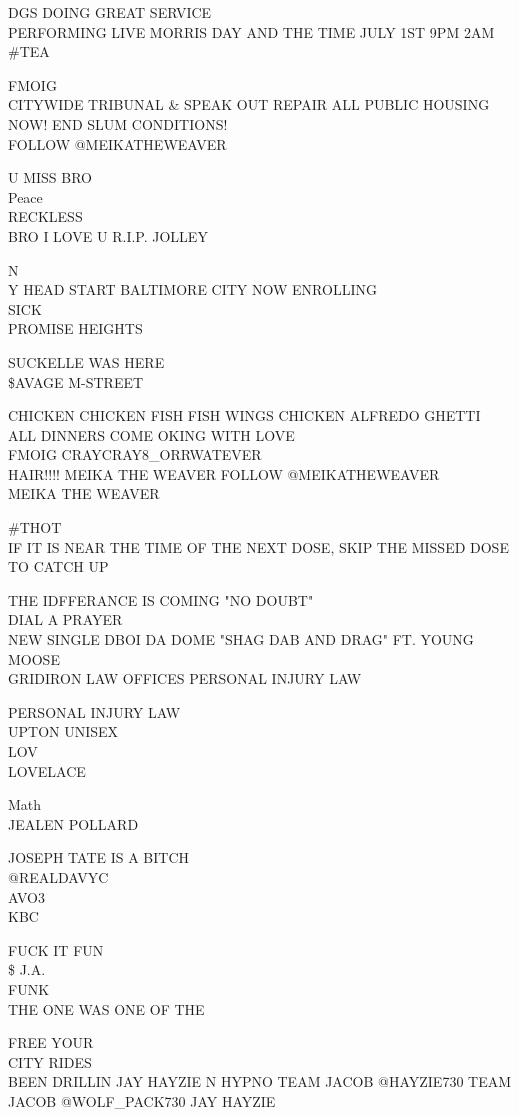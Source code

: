 \documentclass[10pt,letterpaper]{article}
\begin{document}
DGS DOING GREAT SERVICE\\
PERFORMING LIVE MORRIS DAY AND THE TIME JULY 1ST 9PM 2AM\\
\#TEA

FMOIG\\
CITYWIDE TRIBUNAL \& SPEAK OUT REPAIR ALL PUBLIC HOUSING NOW!  END SLUM CONDITIONS!\\
FOLLOW @MEIKATHEWEAVER

U MISS BRO\\
Peace\\
RECKLESS\\
BRO I LOVE U R.I.P. JOLLEY

N\\
Y HEAD START BALTIMORE CITY NOW ENROLLING\\
SICK\\
PROMISE HEIGHTS

SUCKELLE WAS HERE\\
\$AVAGE M{-}STREET

CHICKEN CHICKEN FISH FISH WINGS CHICKEN ALFREDO GHETTI ALL DINNERS COME OKING WITH LOVE\\
FMOIG CRAYCRAY8\_ORRWATEVER\\
HAIR!!!! MEIKA THE WEAVER FOLLOW @MEIKATHEWEAVER\\
MEIKA THE WEAVER

\#THOT\\
IF IT IS NEAR THE TIME OF THE NEXT DOSE, SKIP THE MISSED DOSE TO CATCH UP

THE IDFFERANCE IS COMING "NO DOUBT"\\
DIAL A PRAYER\\
NEW SINGLE DBOI DA DOME "SHAG DAB AND DRAG" FT. YOUNG MOOSE\\
GRIDIRON LAW OFFICES PERSONAL INJURY LAW

PERSONAL INJURY LAW\\
UPTON UNISEX\\
LOV\\
LOVELACE

Math\\
JEALEN POLLARD

JOSEPH TATE IS A BITCH\\
@REALDAVYC\\
AVO3\\
KBC

FUCK IT FUN\\
\$ J.A.\\
FUNK\\
THE ONE WAS ONE OF THE

FREE YOUR\\
CITY RIDES\\
BEEN DRILLIN JAY HAYZIE N HYPNO TEAM JACOB @HAYZIE730 TEAM JACOB @WOLF\_PACK730 JAY HAYZIE
\end{document}
